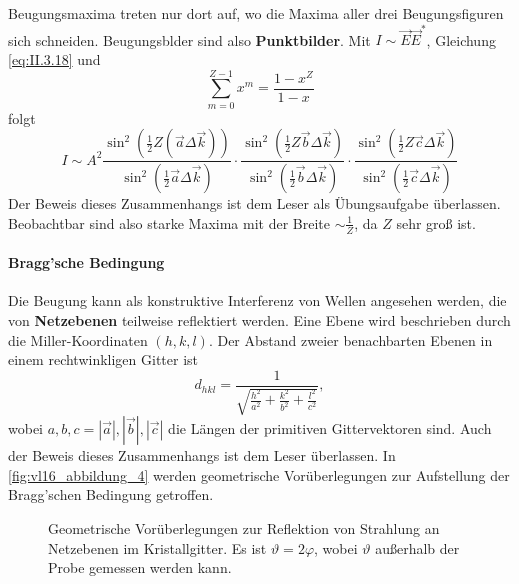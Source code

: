 	Beugungsmaxima treten nur dort auf, wo die Maxima aller drei Beugungsfiguren sich schneiden. 
	Beugungsblder sind also \textbf{Punktbilder}. Mit $I \sim \Vec{E} \Vec{E}^{*}$, Gleichung \eqref{eq:II.3.18} und 
	$$
	\sum_{m=0}^{Z-1}  x^{m} = \frac{1 - x^{Z}}{1 - x}
	$$
	folgt
	\begin{equation}
		\label{eq:II.3.20}
		I \sim A^2 \frac{\sin^2\left( \frac{1}{2} Z \left( \Vec{a} \Delta \Vec{k} \right)  \right) }{\sin^2\left( \frac{1}{2} \Vec{a} \Delta \Vec{k} \right) } \cdot  \frac{\sin^2\left( \frac{1}{2} Z \Vec{b} \Delta \Vec{k} \right) }{\sin^2\left( \frac{1}{2} \Vec{b}\Delta \Vec{k} \right) } \cdot \frac{\sin^2\left( \frac{1}{2} Z \Vec{c} \Delta \Vec{k} \right) }{\sin^2 \left( \frac{1}{2} \Vec{c} \Delta \Vec{k} \right) }
	\end{equation}
	Der Beweis dieses Zusammenhangs ist dem Leser als Übungsaufgabe überlassen. 
	Beobachtbar sind also starke Maxima mit der Breite $\sim \frac{1}{Z}$, da $Z$ sehr groß ist.

\paragraph{Bragg'sche Bedingung} 
	Die Beugung kann als konstruktive Interferenz von Wellen angesehen werden, die von \textbf{Netzebenen} teilweise reflektiert werden. 
	Eine Ebene wird beschrieben durch die Miller-Koordinaten $\left( h,k,l \right)$. 
	Der Abstand zweier benachbarten Ebenen in einem rechtwinkligen Gitter ist
	\begin{equation}
		\label{eq:II.3.21}
		d_{hkl} = \frac{1}{\sqrt{ \frac{h^2}{a^2} + \frac{k^2}{b^2} + \frac{l^2}{c^2}} },
	\end{equation}
	wobei $a,b,c = |\Vec{a}|, |\Vec{b}|, |\Vec{c}|$ die Längen der primitiven Gittervektoren sind. 
	Auch der Beweis dieses Zusammenhangs ist dem Leser überlassen.
	In \autoref{fig:vl16_abbildung_4} werden geometrische Vorüberlegungen zur Aufstellung der Bragg'schen Bedingung getroffen.

	\begin{figure}[H]
		\centering
		\caption{Geometrische Vorüberlegungen zur Reflektion von Strahlung an Netzebenen im Kristallgitter. 
			Es ist $\vartheta = 2\varphi$, wobei $\vartheta$ außerhalb der Probe gemessen werden kann.
		}
		\label{fig:vl16_abbildung_4}
	\end{figure}

